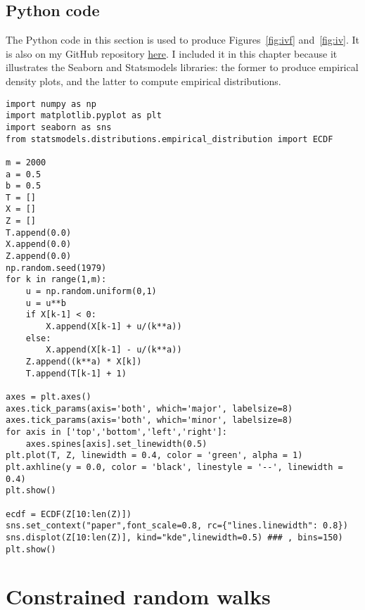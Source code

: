 \documentclass[oneside,10pt]{book}
\begin{document}
\subsection{Python code}\label{dupuis}

The Python code in this section is used to produce Figures~\ref{fig:ivf} and~\ref{fig:iv}. It is also on my GitHub repository
 \href{https://github.com/VincentGranville/Stochastic-Processes/blob/master/brownian_reflective.py}{here}. I included it in this chapter because it illustrates the Seaborn and Statsmodels libraries: the former to produce empirical density plots, and the latter to compute empirical
 distributions. \vspace{1ex}

\begin{lstlisting}
import numpy as np
import matplotlib.pyplot as plt
import seaborn as sns
from statsmodels.distributions.empirical_distribution import ECDF

m = 2000
a = 0.5
b = 0.5
T = []
X = []
Z = []
T.append(0.0)
X.append(0.0)
Z.append(0.0)
np.random.seed(1979)
for k in range(1,m):
    u = np.random.uniform(0,1)
    u = u**b
    if X[k-1] < 0:
        X.append(X[k-1] + u/(k**a))
    else:
        X.append(X[k-1] - u/(k**a))
    Z.append((k**a) * X[k])
    T.append(T[k-1] + 1)

axes = plt.axes()
axes.tick_params(axis='both', which='major', labelsize=8)
axes.tick_params(axis='both', which='minor', labelsize=8)
for axis in ['top','bottom','left','right']:
    axes.spines[axis].set_linewidth(0.5)
plt.plot(T, Z, linewidth = 0.4, color = 'green', alpha = 1)
plt.axhline(y = 0.0, color = 'black', linestyle = '--', linewidth = 0.4)
plt.show()

ecdf = ECDF(Z[10:len(Z)])
sns.set_context("paper",font_scale=0.8, rc={"lines.linewidth": 0.8})
sns.displot(Z[10:len(Z)], kind="kde",linewidth=0.5) ### , bins=150)
plt.show()
\end{lstlisting}


\section{Constrained random walks}




\end{document}
